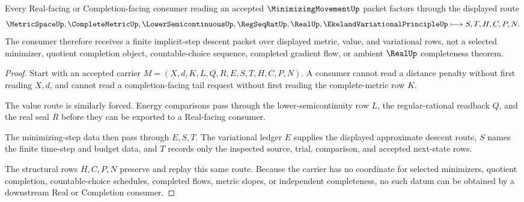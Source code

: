 \begin{theorem}
\label{thm:minimizing-movement-real-completion-route}
Every Real-facing or Completion-facing consumer reading an accepted $\MinimizingMovementUp$ packet factors through the displayed route
$$
\MetricSpaceUp,\CompleteMetricUp,\LowerSemicontinuousUp,\RegSeqRatUp,\RealUp,\EkelandVariationalPrincipleUp
\longmapsto
S,T,H,C,P,N .
$$
The consumer therefore receives a finite implicit-step descent packet over displayed metric, value, and variational rows, not a selected minimizer, quotient completion object, countable-choice sequence, completed gradient flow, or ambient $\RealUp$ completeness theorem.
\end{theorem}
\begin{proof}
Start with an accepted carrier $M=(X,d,K,L,Q,R,E,S,T,H,C,P,N)$. A consumer cannot read a distance penalty without first reading $X,d$, and cannot read a completion-facing tail request without first reading the complete-metric row $K$.

The value route is similarly forced. Energy comparisons pass through the lower-semicontinuity row $L$, the regular-rational readback $Q$, and the real seal $R$ before they can be exported to a Real-facing consumer.

The minimizing-step data then pass through $E,S,T$. The variational ledger $E$ supplies the displayed approximate descent route, $S$ names the finite time-step and budget data, and $T$ records only the inspected source, trial, comparison, and accepted next-state rows.

The structural rows $H,C,P,N$ preserve and replay this same route. Because the carrier has no coordinate for selected minimizers, quotient completion, countable-choice schedules, completed flows, metric slopes, or independent completeness, no such datum can be obtained by a downstream Real or Completion consumer.
\end{proof}


